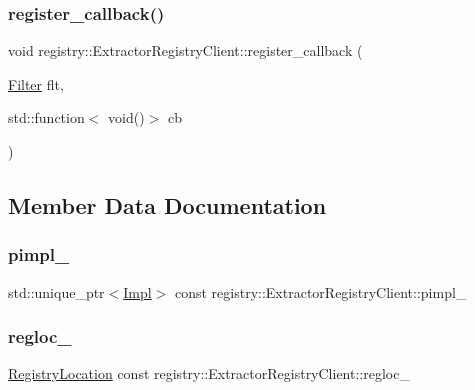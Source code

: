 \subsubsection{\texorpdfstring{register\+\_\+callback()}{register\_callback()}}
{\footnotesize\ttfamily void registry\+::\+Extractor\+Registry\+Client\+::register\+\_\+callback (\begin{DoxyParamCaption}\item[{\hyperlink{classregistry_1_1Filter}{Filter}}]{flt,  }\item[{std\+::function$<$ void()$>$}]{cb }\end{DoxyParamCaption})}



\subsection{Member Data Documentation}
\mbox{\label{classregistry_1_1ExtractorRegistryClient_a7317fd7b55decd9a8f8c9db522db9b15}} 
\subsubsection{\texorpdfstring{pimpl\+\_\+}{pimpl\_}}
{\footnotesize\ttfamily std\+::unique\+\_\+ptr$<$\hyperlink{classregistry_1_1ExtractorRegistryClient_1_1Impl}{Impl}$>$ const registry\+::\+Extractor\+Registry\+Client\+::pimpl\+\_\+\hspace{0.3cm}{\ttfamily [private]}}

\mbox{\label{classregistry_1_1ExtractorRegistryClient_a1092af361441aac2f5d84ae79267f4b7}} 
\subsubsection{\texorpdfstring{regloc\+\_\+}{regloc\_}}
{\footnotesize\ttfamily \hyperlink{structregistry_1_1RegistryLocation}{Registry\+Location} const registry\+::\+Extractor\+Registry\+Client\+::regloc\+\_\+\hspace{0.3cm}{\ttfamily [private]}}

